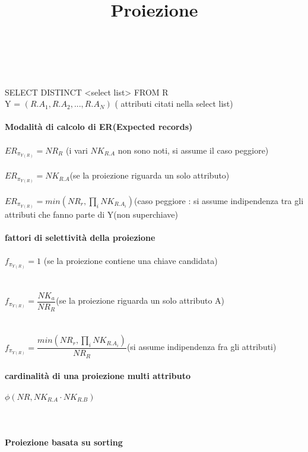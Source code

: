 \documentclass[a4paper,12pt]{article}
\begin{document}
\begin{titlepage}
\begin{titlepage}
\begin{center}
		\end{center}
		\end{titlepage}
		\begin{titlepage}
		\title{\huge \textbf{Proiezione}} \\ \\
		\maketitle
		SELECT DISTINCT <select list> FROM R \\
		Y = ${{(R.A_{1}, R.A_{2}, ..., R.A_{N})}}$ ( attributi citati nella select list) \\ \\
		\textbf{Modalità di calcolo di ER(Expected records)} \\ \\
		$ ER_{\pi_{Y(R)}} = NR_{R} $ (i vari $ NK_{R.A} $ non sono noti, si assume il caso peggiore) \\ \\
		$ ER_{\pi_{Y(R)}} = NK_{R.A} $(se la proiezione riguarda un solo attributo)  \\\\
		$ ER_{\pi_{Y(R)}} = min(NR_{r}, \prod_{i}^{} NK_{R.A_{i}}) $(caso peggiore : si assume indipendenza tra gli attributi che fanno parte di Y(non superchiave) \\\\
		\textbf{fattori di selettività della proiezione} \\ \\
		$ f_{\pi_{Y(R)}} = 1 $ (se la proiezione contiene una chiave candidata) \\ \\\\
		$ f_{\pi_{Y(R)}} = \dfrac{NK_{a}}{NR_{R}} $(se la proiezione riguarda un solo attributo A)\\ \\\\
		$ f_{\pi_{Y(R)}} = \dfrac{min(NR_{r}, \prod_{i}^{} NK_{R.A_{i}})}{NR_{R}} $(si assume indipendenza fra gli attributi) \\ \\
		\textbf{cardinalità di una proiezione multi attributo} \\ \\
		${\phi(NR, NK_{R.A} \cdot NK_{R.B})}$ \\ \\ \\ \\
		\textbf{Proiezione basata su sorting} \\ \\  

\end{titlepage}
\end{titlepage}
\end{document}
